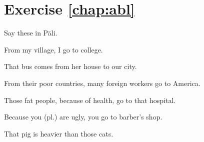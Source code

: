 \section*{Exercise \ref{chap:abl}}
Say these in P\=ali.
\begin{compactenum}
\item From my village, I go to college.
\item That bus comes from her house to our city.
\item From their poor countries, many foreign workers go to America.
\item Those fat people, because of health, go to that hospital.
\item Because you (pl.) are ugly, you go to barber's shop.
\item That pig is heavier than those cats.
\end{compactenum}
